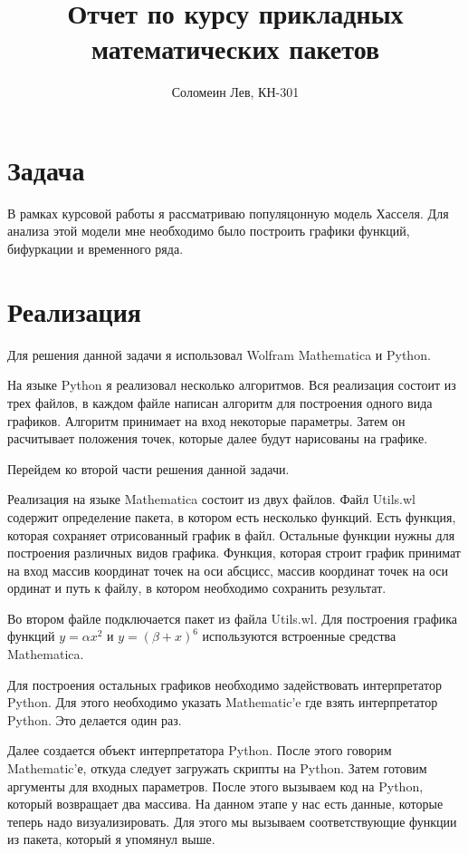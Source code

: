 \documentclass[14pt]{extarticle}
\title{Отчет по курсу прикладных математических пакетов}
\author{Соломеин Лев, КН-301}
\begin{document}
    \maketitle

    \clearpage

    \section*{Задача}

        В рамках курсовой работы я рассматриваю популяцонную модель Хасселя. Для анализа этой модели мне необходимо было построить графики функций, бифуркации и временного ряда.

    \section*{Реализация}

        Для решения данной задачи я использовал Wolfram Mathematica и Python. 
        
        На языке Python я реализовал несколько алгоритмов. Вся реализация состоит из трех файлов, в каждом файле написан алгоритм для построения одного вида графиков. Алгоритм принимает на вход некоторые параметры. Затем он расчитывает положения точек, которые далее будут нарисованы на графике.

        Перейдем ко второй части решения данной задачи. 

        Реализация на языке Mathematica состоит из двух файлов. Файл Utils.wl содержит определение пакета, в котором есть несколько функций. Есть функция, которая сохраняет отрисованный график в файл. Остальные функции нужны для построения различных видов графика. Функция, которая строит график принимат на вход массив координат точек на оси абсцисс, массив координат точек на оси ординат и путь к файлу, в котором необходимо сохранить результат.

        Во втором файле подключается пакет из файла Utils.wl. Для построения графика функций \(y = \alpha x^2\) и \(y = (\beta + x)^6\) используются встроенные средства Mathematica. 
        
        Для построения остальных графиков необходимо задействовать интерпретатор Python. Для этого необходимо указать Mathematic'e где взять интерпретатор Python. Это делается один раз. 
        
        Далее создается объект интерпретатора Python. После этого говорим Mathematic'е, откуда следует загружать скрипты на Python. Затем готовим аргументы для входных параметров. После этого вызываем код на Python, который возвращает два массива. На данном этапе у нас есть данные, которые теперь надо визуализировать. Для этого мы вызываем соответствующие функции из пакета, который я упомянул выше.
\end{document}
